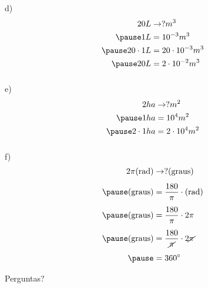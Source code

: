 \documentclass[handout]{beamer}
\begin{document}
\begin{frame}\frametitle{\subsecname}
    d)
    \begin{align*}
        20L &\rightarrow ? m^3\\ \pause
        1L &= 10^{-3}m^3 \\ \pause
        20\cdot 1L&=20\cdot10^{-3}m^3\\ \pause
        20L &= 2\cdot 10^{-2}m^3
    \end{align*}
\end{frame}

\begin{frame}\frametitle{\subsecname}
    e)
    \begin{align*}
        2ha &\rightarrow ? m^2\\ \pause
        1ha &= 10^{4}m^2 \\ \pause
        2\cdot 1ha&=2\cdot10^{4}m^2
    \end{align*}
\end{frame}

\begin{frame}\frametitle{\subsecname}
    f)
    \begin{align*}
        2\pi \text{(rad)} &\rightarrow ? \text{(graus)}\\[1ex] \pause
        \text{(graus)} &= \frac{180}{\pi}\cdot\text{(rad)} \\[1ex] \pause
        \text{(graus)} &= \frac{180}{\pi}\cdot2\pi \\[1ex] \pause
        \text{(graus)} &= \frac{180}{\cancel{\pi}}\cdot2\cancel{\pi} \\[1ex]\pause
         &= 360^\circ
    \end{align*}
\end{frame}


\begin{frame}
    \Huge{\centerline{Perguntas?}}
\end{frame}

\end{document}
